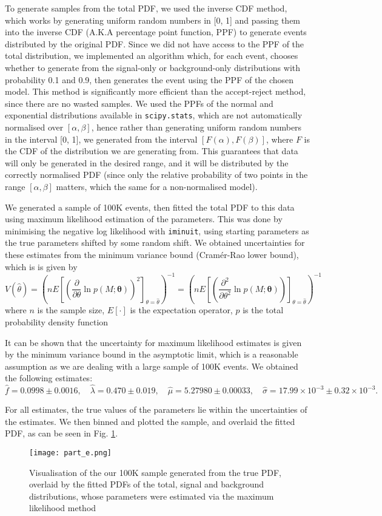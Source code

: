 \documentclass{article}
\begin{document}
To generate samples from the total PDF, we used the inverse CDF method, which works by generating uniform random numbers in [0, 1] and passing them into the inverse CDF (A.K.A percentage point function, PPF) to generate events distributed by the original PDF. Since we did not have access to the PPF of the total distribution, we implemented an algorithm which, for each event, chooses whether to generate from the signal-only or background-only distributions with probability 0.1 and 0.9, then generates the event using the PPF of the chosen model. This method is significantly more efficient than the accept-reject method, since there are no wasted samples. We used the PPFs of the normal and exponential distributions available in \texttt{scipy.stats}, which are not automatically normalised over $[\alpha, \beta]$, hence rather than generating uniform random numbers in the interval [0, 1], we generated from the interval $[F(\alpha), F(\beta)]$, where $F$ is the CDF of the distribution we are generating from. This guarantees that data will only be generated in the desired range, and it will be distributed by the correctly normalised PDF (since only the relative probability of two points in the range $[\alpha, \beta]$ matters, which the same for a non-normalised model).

We generated a sample of 100K events, then fitted the total PDF to this data using maximum likelihood estimation of the parameters. This was done by minimising the negative log likelihood with \texttt{iminuit}, using starting parameters as the true parameters shifted by some random shift. We obtained uncertainties for these estimates from the minimum variance bound (Cramér-Rao lower bound), which is is given by
\[
V(\hat{\theta}) = \left( {nE\left[\left(\frac{{\partial}}{{\partial\theta}}\ln p(M; \boldsymbol{\theta})\right)^2\right]_{\theta=\hat{\theta}}} \right) ^{-1}
= \left( {nE\left[\left(\frac{{\partial^2}}{{\partial\theta^2}}\ln p(M; \boldsymbol{\theta})\right)\right]_{\theta=\hat{\theta}}} \right)^{-1}
\]
where $n$ is the sample size, $E[\cdot]$ is the expectation operator, $p$ is the total probability density function

It can be shown that the uncertainty for maximum likelihood estimates is given by the minimum variance bound in the asymptotic limit, which is a reasonable assumption as we are dealing with a large sample of 100K events. We obtained the following estimates:
\[ \hat{f} = 0.0998 \pm 0.0016, \quad \hat{\lambda} = 0.470 \pm 0.019, \quad \hat{\mu} = 5.27980 \pm 0.00033, \quad \hat{\sigma} = 17.99 \times 10^{-3} \pm 0.32 \times 10^{-3}. \]

For all estimates, the true values of the parameters lie within the uncertainties of the estimates. We then binned and plotted the sample, and overlaid the fitted PDF, as can be seen in Fig. \ref{fig:e}.

\begin{figure}[h]
\centering
\texttt{[image: part\_e.png]}
\caption{Visualisation of the our 100K sample generated from the true PDF, overlaid by the fitted PDFs of the total, signal and background distributions, whose parameters were estimated via the maximum likelihood method}
\label{fig:e}
\end{figure}
\end{document}
